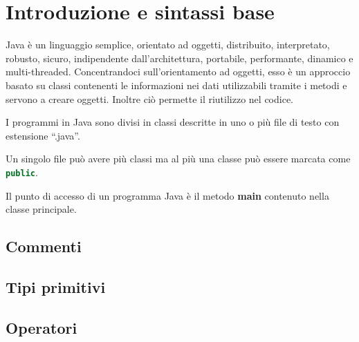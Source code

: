 \documentclass[12pt]{article}
\begin{document}


\tableofcontents
\restoregeometry

\section{Introduzione e sintassi base}
Java è un linguaggio semplice, orientato ad oggetti, distribuito, interpretato, robusto, sicuro, indipendente dall'architettura,
portabile, performante, dinamico e multi-threaded.
\noindent
Concentrandoci sull'orientamento ad oggetti, esso è un approccio basato su classi contenenti le informazioni nei dati utilizzabili
tramite i metodi e servono a creare oggetti. Inoltre ciò permette il riutilizzo nel codice.

I programmi in Java sono divisi in classi descritte in uno o più file di testo con estensione ``.java''.

\begin{Note*} \label{Note:1}
    Un singolo file può avere più classi ma al più una classe può essere marcata come \lstinline[language = java]{public}.
\end{Note*}
\begin{Note*}\label{Note:2}
    Il punto di accesso di un programma Java è il metodo \textbf{main} contenuto nella classe principale.
\end{Note*}


\subsection{Commenti}


\subsection{Tipi primitivi}


\subsection{Operatori}

\end{document}
